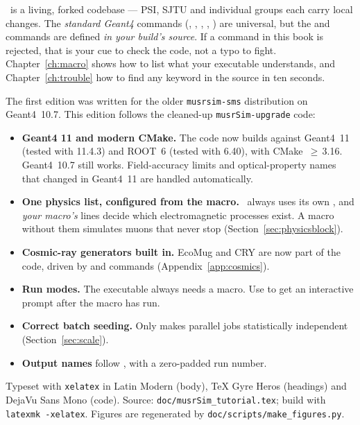 \begin{checkbuild}
\musrSim\ is a living, forked codebase --- PSI, SJTU and individual groups each carry local changes. The \emph{standard Geant4} commands (, , , , ) are universal, but the  and  commands are defined \emph{in your build's source}. If a command in this book is rejected, that is your cue to check the code, not a typo to fight. Chapter~\ref{ch:macro} shows how to list what your executable understands, and Chapter~\ref{ch:trouble} how to find any keyword in the source in ten seconds.
\end{checkbuild}

The first edition was written for the older \texttt{musrsim-sms} distribution on Geant4~10.7. This edition follows the cleaned-up \texttt{musrSim-upgrade} code:

\begin{itemize}
  \item \textbf{Geant4 11 and modern CMake.} The code now builds against Geant4~11 (tested with 11.4.3) and ROOT~6 (tested with 6.40), with CMake~$\ge$\,3.16. Geant4~10.7 still works. Field-accuracy limits and optical-property names that changed in Geant4~11 are handled automatically.
  \item \textbf{One physics list, configured from the macro.} \musrSim\ always uses its own , and \emph{your macro's}  lines decide which electromagnetic processes exist. A macro without them simulates muons that never stop (Section~\ref{sec:physicsblock}).
  \item \textbf{Cosmic-ray generators built in.} EcoMug and CRY are now part of the code, driven by  and  commands (Appendix~\ref{app:cosmics}).
  \item \textbf{Run modes.} The executable always needs a macro. Use  to get an interactive prompt after the macro has run.
  \item \textbf{Correct batch seeding.} Only  makes parallel jobs statistically independent (Section~\ref{sec:scale}).
  \item \textbf{Output names} follow , with a zero-padded run number.
\end{itemize}

\vfill
{\sffamily\scriptsize\color{muted}Typeset with \texttt{xelatex} in Latin Modern (body), TeX Gyre Heros (headings) and DejaVu Sans Mono (code). Source: \texttt{doc/musrSim\_tutorial.tex}; build with \texttt{latexmk -xelatex}. Figures are regenerated by \texttt{doc/scripts/make\_figures.py}.\par}

